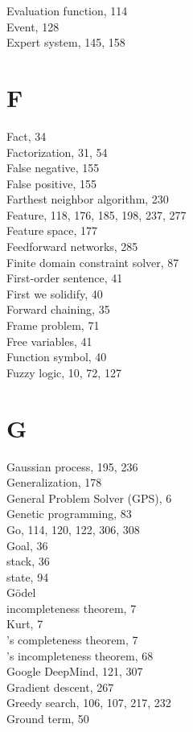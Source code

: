 \documentclass[10pt]{article}
\begin{document}
Evaluation function, 114\\
Event, 128\\
Expert system, 145, 158

\section*{F}
Fact, 34\\
Factorization, 31, 54\\
False negative, 155\\
False positive, 155\\
Farthest neighbor algorithm, 230\\
Feature, 118, 176, 185, 198, 237, 277\\
Feature space, 177\\
Feedforward networks, 285\\
Finite domain constraint solver, 87\\
First-order sentence, 41\\
First we solidify, 40\\
Forward chaining, 35\\
Frame problem, 71\\
Free variables, 41\\
Function symbol, 40\\
Fuzzy logic, 10, 72, 127

\section*{G}
Gaussian process, 195, 236\\
Generalization, 178\\
General Problem Solver (GPS), 6\\
Genetic programming, 83\\
Go, 114, 120, 122, 306, 308\\
Goal, 36\\
stack, 36\\
state, 94\\
Gödel\\
incompleteness theorem, 7\\
Kurt, 7\\
's completeness theorem, 7\\
's incompleteness theorem, 68\\
Google DeepMind, 121, 307\\
Gradient descent, 267\\
Greedy search, 106, 107, 217, 232\\
Ground term, 50
\end{document}
